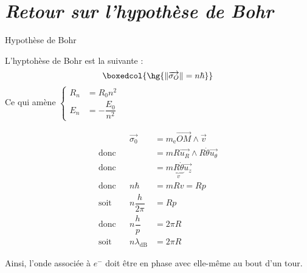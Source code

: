 \documentclass[a4paper,french,bookmarks]{article}
\begin{document}

\section*{\centering\EBGaramond\itshape\Large Retour sur l'hypothèse de Bohr}
    
\begin{minipage}{0.48\linewidth}

\begin{form}{Hypothèse de Bohr}{}{}
    \begin{center}
    \end{center}
    L'hyptohèse de Bohr est la suivante :
    \[ \boxedcol{\hg{\norm{\vec{\sigma_O}} = n\hbar}}\]
    Ce qui amène $\left\lbrace\begin{array}{rl}
        R_n &= R_0n^2  \\
        E_n &= - \dfrac{E_0}{n^2} 
        \end{array}\right.$
\end{form}
\end{minipage}
%
\hfill
%
\begin{minipage}{0.48\linewidth}
    \begin{align*}
        &&\vec{\sigma_0} &= m_\text{e} \vec{OM} \wedge \vec{v}\\
        \text{donc} && &= mR\vec{u_R} \wedge R\dot \theta \vec{u_\theta}\\
        \text{donc} &&     &= m\underbrace{R\dot\theta}_{v} \vec{u_z}\\
    \text{donc} && n \hbar &= mRv = Rp\\
    \text{soit} && n\dfrac{h}{2\pi} &= Rp\\
    \text{donc} && n\dfrac{h}{p} &= 2\pi R\\
    \text{soit} && n\lambda_\text{dB} &= 2\pi R
    \end{align*}
    
    Ainsi, l'onde associée à $e^-$ doit être en phase avec elle-même au bout d'un tour.
\end{minipage}
\end{document}
